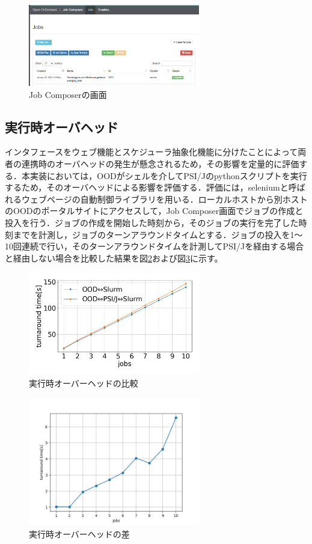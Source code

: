 \documentclass[a4paper,oneside,twocolumn,notitlepage,dvipdfmx]{jsarticle}
\begin{document}
\begin{figure}[tb]
  \centering
  \includegraphics[width=75mm]{./fig/jobcomposer.png}
  \caption{Job Composerの画面}
  \label{fig4}
\end{figure}

\subsection{実行時オーバヘッド}
インタフェースをウェブ機能とスケジューラ抽象化機能に分けたことによって両者の連携時のオーバヘッドの発生が懸念されるため，その影響を定量的に評価する．本実装においては，OODがシェルを介してPSI/Jのpythonスクリプトを実行するため，そのオーバヘッドによる影響を評価する．評価には，seleniumと呼ばれるウェブページの自動制御ライブラリを用いる．ローカルホストから別ホストのOODのポータルサイトにアクセスして，Job Composer画面でジョブの作成と投入を行う．ジョブの作成を開始した時刻から，そのジョブの実行を完了した時刻までを計測し，ジョブのターンアラウンドタイムとする．ジョブの投入を1～10回連続で行い，そのターンアラウンドタイムを計測してPSI/Jを経由する場合と経由しない場合を比較した結果を図\ref{fig2}および図\ref{fig3}に示す。\par

\begin{figure}[h]
  \centering
  \includegraphics[width=75mm]{./fig/ave_1-20.png}
  \vspace{-10pt}
  \caption{実行時オーバーヘッドの比較}
  \label{fig2}
\end{figure}

\begin{figure}[h]
  \centering
  \includegraphics[width=75mm]{./fig/ave_diff_1-20.png}
  \vspace{-10pt}
  \caption{実行時オーバーヘッドの差}
  \label{fig3}
\end{figure}
\end{document}
